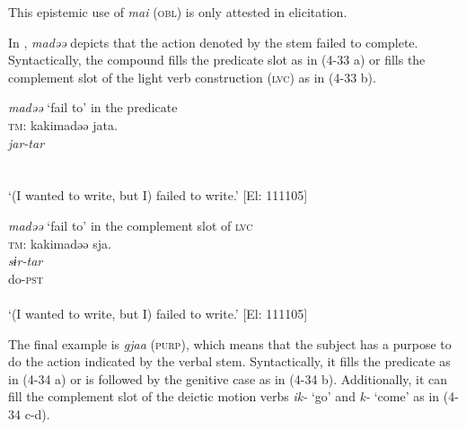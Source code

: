This epistemic use of \textit{mai} (\textsc{obl}) is only attested in elicitation.

In , \textit{madəə} depicts that the action denoted by the stem failed to complete. Syntactically, the compound fills the predicate slot as in (4-33 a) or fills the complement slot of the light verb construction (\textsc{lvc}) as in (4-33 b).

\ea \label{ex:4.33}
\ea \textit{madəə} ‘fail to’ in the predicate \label{ex:4.33a}\\
\gllll  \textsc{tm}:  kakimadəə  jata.\\
    \textit{}  \textit{jar-tar}\\
    [write-\textsc{inf}+fail.to  \textsc{cop}-\textsc{pst}]\\
    [Nominal predicate]\\
  \glt     ‘(I wanted to write, but I) failed to write.’ [El: 111105]

\ex \textit{madəə} ‘fail to’ in the complement slot of \textsc{lvc}\\
\gllll  \textsc{tm}:  kakimadəə  sja.\\
    \textit{}  \textit{sɨr-tar}\\
    [write-\textsc{inf}+fail.to]  do-\textsc{pst}\\
    [Complement]  \\
  \glt     ‘(I wanted to write, but I) failed to write.’ [El: 111105]
  \z
\z

The final example is \textit{gjaa} (\textsc{purp}), which means that the subject has a purpose to do the action indicated by the verbal stem. Syntactically, it fills the predicate as in (4-34 a) or is followed by the genitive case as in (4-34 b). Additionally, it can fill the complement slot of the deictic motion verbs \textit{ik-} ‘go’ and \textit{k-} ‘come’ as in (4-34 c-d).

